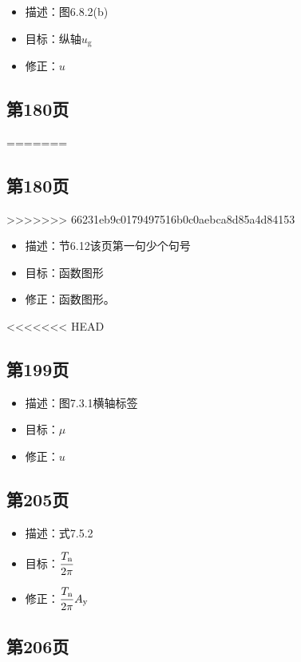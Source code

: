 \documentclass[11pt]{article}
\begin{document}
\begin{itemize}
\item 描述：图6.8.2(b)
\item 目标：纵轴\(u_{\mathrm{g}}\)
\item 修正：\(u\)
\end{itemize}

\subsection*{第180页}
\label{sec:org7aff7b6}
=======
\subsection*{第180页}
\label{sec:org1616444}
>>>>>>> 66231eb9c0179497516b0c0aebca8d85a4d84153

\begin{itemize}
\item 描述：节6.12该页第一句少个句号
\item 目标：函数图形
\item 修正：函数图形。
\end{itemize}

<<<<<<< HEAD
\subsection*{第199页}
\label{sec:orgf0887b0}

\begin{itemize}
\item 描述：图7.3.1横轴标签
\item 目标：\(\mu\)
\item 修正：\(u\)
\end{itemize}

\subsection*{第205页}
\label{sec:org70a970e}

\begin{itemize}
\item 描述：式7.5.2
\item 目标：\(\dfrac{T_\mathrm{n}}{2\pi}\)
\item 修正：\(\dfrac{T_\mathrm{n}}{2\pi}A_{\mathrm{y}}\)
\end{itemize}

\subsection*{第206页}
\label{sec:org3109cc3}
\end{document}
